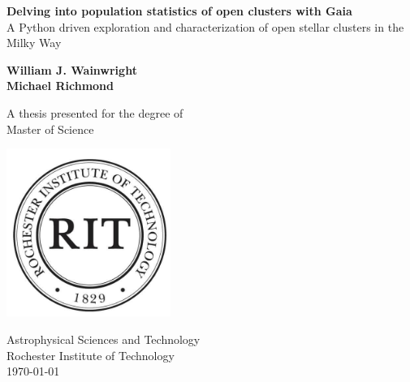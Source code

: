 \documentclass{article}
\begin{document}
\begin{titlepage}
   \begin{center}
       \vspace*{1cm}
       
       \huge
       \textbf{Delving into population statistics of open clusters with Gaia}
       \large
       \vspace{0.5cm} \\
        A Python driven exploration and characterization of open stellar clusters in the Milky Way
            
       \vspace{1.5cm}

       \huge
       \textbf{William J. Wainwright} \\
       \vspace{0.25cm}
       \large
       \textbf{Michael Richmond}
       \normalsize

       \vfill
            
       A thesis presented for the degree of\\
       Master of Science
            
       \vspace{0.8cm}
     
       \includegraphics[width=0.4\textwidth]{figures/RIT_seal.jpg}
            
       Astrophysical Sciences and Technology\\
       Rochester Institute of Technology\\
       \today
            
   \end{center}
\end{titlepage}
\end{document}
